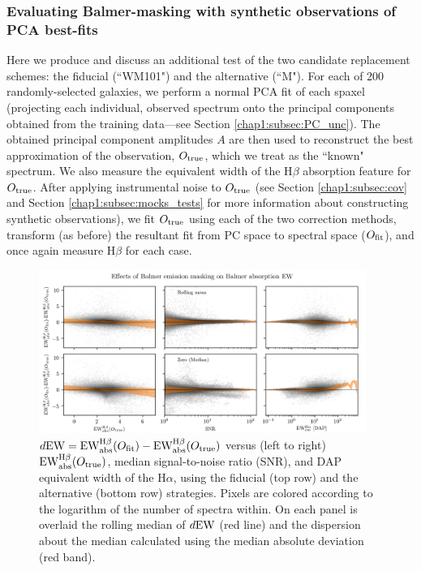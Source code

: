 \subsubsection{Evaluating Balmer-masking with synthetic observations of PCA best-fits}

Here we produce and discuss an additional test of the two candidate replacement schemes: the fiducial (``WM101") and the alternative (``M"). For each of 200 randomly-selected galaxies, we perform a normal PCA fit of each spaxel (projecting each individual, observed spectrum onto the principal components obtained from the training data---see Section \ref{chap1:subsec:PC_unc}). The obtained principal component amplitudes $A$ are then used to reconstruct the best approximation of the observation, $O_{\rm true}$, which we treat as the ``known" spectrum. We also measure the equivalent width of the H$\beta$ absorption feature \citep{worthey_ottaviani_97} for $O_{\rm true}$. After applying instrumental noise to $O_{\rm true}$ (see Section \ref{chap1:subsec:cov} and Section \ref{chap1:subsec:mocks_tests} for more information about constructing synthetic observations), we fit $O_{\rm true}$ using each of the two correction methods, transform (as before) the resultant fit from PC space to spectral space ($O_{\rm fit}$), and once again measure H$\beta$ for each case.

\begin{figure}
    \centering
    \includegraphics[width=0.95\textwidth]{balmer_abs_compare}
    \caption[Effects of Balmer-masking strategies]{\fixspacing $d{\rm EW} = {\rm EW_{abs}^{H\beta}}(O_{\rm fit}) - {\rm EW_{abs}^{H\beta}}(O_{\rm true})$ versus (left to right) ${\rm EW_{abs}^{H\beta}}(O_{\rm true})$, median signal-to-noise ratio (SNR), and DAP equivalent width of the H$\alpha$, using the fiducial (top row) and the alternative (bottom row) strategies. Pixels are colored according to the logarithm of the number of spectra within. On each panel is overlaid the rolling median of $d{\rm EW}$ (red line) and the dispersion about the median calculated using the median absolute deviation (red band).}
    \label{fig:mocks_of_fits_ewHb}
\end{figure}

